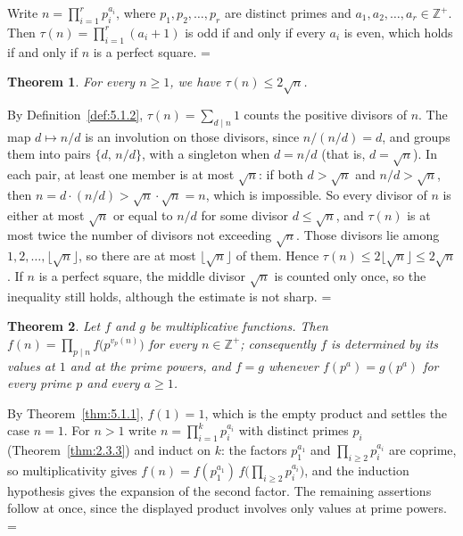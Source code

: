 \documentclass[11pt]{article}
\makeatletter
\let\nt@closedisplay\]
\def\nt@guardedclose{\@ifnextchar\par{\nt@closeafterpar}{\@ifnextchar\end{\postdisplaypenalty\@M\nt@closedisplay}{\nt@closedisplay}}}
\def\nt@closeafterpar\par{\@ifnextchar\par{\nt@closeafterpar}{\@ifnextchar\end{\postdisplaypenalty\@M\nt@closedisplay\par}{\nt@closedisplay\par}}}
\renewenvironment{proof}[1][\proofname]{\par
  \pushQED{\qed}\normalfont\topsep\medskipamount\edef\nt@afterproof{\@endparpenalty=\the\@endparpenalty\relax}\@beginparpenalty\@M\@endparpenalty\@M\let\]\nt@guardedclose\trivlist\item[]\textit{#1\@addpunct{.}} \ignorespaces}{\ifvmode\addpenalty\@M\fi\popQED\nt@afterproof\endtrivlist\@endpefalse}
\theoremstyle{ntstyle}
\newtheorem{theorem}{Theorem}[subsection]
\makeatother
\begin{document}
\begin{proof} Write
  $n=\prod_{i=1}^{r}p_i^{a_i}$, where $p_1,p_2,\ldots,p_r$ are distinct
  primes and $a_1,a_2,\ldots,a_r\in\mathbb{Z}^+$. Then
  $\tau(n)=\prod_{i=1}^{r}(a_i+1)$ is odd if and only if every $a_i$ is
  even, which holds if and only if $n$ is a perfect square.
\end{proof}

\begin{theorem}\label{thm:5.1.9} For
  every $n\ge1$, we have $\tau(n)\le 2\sqrt{n}$.

\end{theorem}

\begin{proof} By Definition~\ref{def:5.1.2}, $\tau(n)=\sum_{d\mid n}1$
  counts the positive divisors of $n$. The map
  $d\mapsto n/d$ is an involution on those divisors, since $n/(n/d)=d$,
  and groups them into
  pairs $\{d,\,n/d\}$, with a singleton when $d=n/d$ (that is, $d=\sqrt{n}$).
  In each pair, at least one member is
  at most $\sqrt{n}$: if both $d>\sqrt{n}$ and $n/d>\sqrt{n}$, then $n=d\cdot(n/d)>\sqrt{n}\cdot\sqrt{n}=n$,
  which is impossible. So every divisor of $n$ is either at most $\sqrt{n}$ or
  equal to $n/d$ for some divisor $d\le\sqrt{n}$, and $\tau(n)$ is at most twice the number of divisors not
  exceeding $\sqrt{n}$. Those divisors lie among $1,2,\ldots,\lfloor\sqrt{n}\rfloor$, so there are at most
  $\lfloor\sqrt{n}\rfloor$ of them.
  Hence $\tau(n)\le 2\lfloor\sqrt{n}\rfloor\le 2\sqrt{n}$. If $n$
  is a perfect square, the middle divisor $\sqrt n$ is counted only once,
  so the inequality still holds, although the estimate is not sharp.
\end{proof}

\begin{theorem}\label{thm:5.1.10} Let $f$ and $g$ be multiplicative
  functions. Then $f(n)=\prod_{p\mid n}f\bigl(p^{v_p(n)}\bigr)$ for every
  $n\in\mathbb{Z}^+$; consequently $f$ is determined by its values at $1$ and
  at the prime powers, and $f=g$ whenever $f(p^{a})=g(p^{a})$ for every prime $p$ and every $a\ge1$.

\end{theorem}

\begin{proof} By Theorem~\ref{thm:5.1.1}, $f(1)=1$, which is the
  empty product and settles the case $n=1$. For $n>1$ write
  $n=\prod_{i=1}^{k}p_i^{a_i}$ with distinct primes $p_i$
  (Theorem~\ref{thm:2.3.3}) and induct on $k$: the factors $p_1^{a_1}$ and
  $\prod_{i\ge2}p_i^{a_i}$ are coprime, so multiplicativity gives
  $f(n)=f(p_1^{a_1})\,f\big(\prod_{i\ge2}p_i^{a_i}\big)$, and the induction
  hypothesis gives the expansion of the second factor. The remaining assertions follow at
  once, since the displayed product involves only values at prime powers.
\end{proof}
\end{document}
